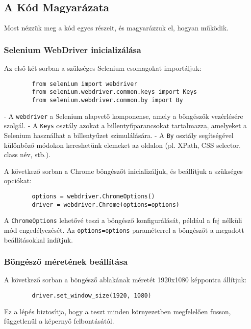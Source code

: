 \documentclass[12pt]{article}
\begin{document}
	\subsection{A Kód Magyarázata}
	
	Most nézzük meg a kód egyes részeit, és magyarázzuk el, hogyan működik.
	
	\subsubsection{Selenium WebDriver inicializálása}
	
	Az első két sorban a szükséges Selenium csomagokat importáljuk:
	
	\begin{lstlisting}
		from selenium import webdriver
		from selenium.webdriver.common.keys import Keys
		from selenium.webdriver.common.by import By
	\end{lstlisting}
	
	- A \texttt{webdriver} a Selenium alapvető komponense, amely a böngészők vezérlésére szolgál.
	- A \texttt{Keys} osztály azokat a billentyűparancsokat tartalmazza, amelyeket a Selenium használhat a billentyűzet szimulálására.
	- A \texttt{By} osztály segítségével különböző módokon kereshetünk elemeket az oldalon (pl. XPath, CSS selector, class név, stb.).
	
	A következő sorban a Chrome böngészőt inicializáljuk, és beállítjuk a szükséges opciókat:
	
	\begin{lstlisting}
		options = webdriver.ChromeOptions()
		driver = webdriver.Chrome(options=options)
	\end{lstlisting}
	
	A \texttt{ChromeOptions} lehetővé teszi a böngésző konfigurálását, például a fej nélküli mód engedélyezését. Az \texttt{options=options} paraméterrel a böngészőt a megadott beállításokkal indítjuk.
	
	\subsubsection{Böngésző méretének beállítása}
	
	A következő sorban a böngésző ablakának méretét 1920x1080 képpontra állítjuk:
	
	\begin{lstlisting}
		driver.set_window_size(1920, 1080)
	\end{lstlisting}
	
	Ez a lépés biztosítja, hogy a teszt minden környezetben megfelelően fusson, függetlenül a képernyő felbontásától.
	
\end{document}

